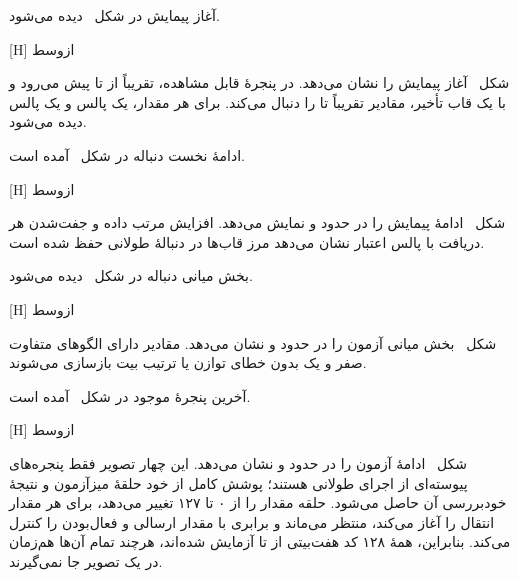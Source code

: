 آغاز پیمایش در شکل~ دیده می‌شود.

[H]
‌ازوسط

شکل~ آغاز پیمایش را نشان می‌دهد. در پنجرهٔ قابل مشاهده،
 تقریباً از  تا  پیش می‌رود و  با
یک قاب تأخیر، مقادیر تقریباً  تا  را دنبال می‌کند. برای هر مقدار، یک
پالس  و یک پالس  دیده می‌شود.

ادامهٔ نخست دنباله در شکل~ آمده است.

[H]
‌ازوسط

شکل~ ادامهٔ پیمایش را در حدود
 و  نمایش می‌دهد. افزایش مرتب
داده و جفت‌شدن هر دریافت با پالس اعتبار نشان می‌دهد مرز قاب‌ها در دنبالهٔ طولانی حفظ شده
است.

بخش میانی دنباله در شکل~ دیده می‌شود.

[H]
‌ازوسط

شکل~ بخش میانی آزمون را در حدود
 و  نشان می‌دهد. مقادیر دارای
الگوهای متفاوت صفر و یک بدون خطای توازن یا ترتیب بیت بازسازی می‌شوند.

آخرین پنجرهٔ موجود در شکل~ آمده است.

[H]
‌ازوسط

شکل~ ادامهٔ آزمون را در حدود
 و  نشان می‌دهد. این چهار تصویر
فقط پنجره‌های پیوسته‌ای از اجرای طولانی هستند؛ پوشش کامل از خود حلقهٔ میزآزمون و نتیجهٔ
خودبررسی آن حاصل می‌شود. حلقه مقدار  را از ۰ تا ۱۲۷ تغییر می‌دهد، برای هر مقدار
انتقال را آغاز می‌کند، منتظر  می‌ماند و برابری  با
مقدار ارسالی و فعال‌بودن  را کنترل می‌کند. بنابراین، همهٔ ۱۲۸ کد
هفت‌بیتی از  تا  آزمایش شده‌اند، هرچند تمام آن‌ها هم‌زمان در یک تصویر
جا نمی‌گیرند.


